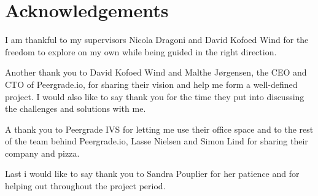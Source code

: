 \chapter{Acknowledgements}

I am thankful to my supervisors Nicola Dragoni and David Kofoed Wind for the freedom to explore on my own while being guided in the right direction.

Another thank you to David Kofoed Wind and Malthe Jørgensen, the CEO and CTO of Peergrade.io, for sharing their vision and help me form a well-defined project. I would also like to say thank you for the time they put into discussing the challenges and solutions with me.

A thank you to Peergrade IVS for letting me use their office space and to the rest of the team behind Peergrade.io, Lasse Nielsen and Simon Lind for sharing their company and pizza.

Last i would like to say thank you to Sandra Pouplier for her patience and for helping out throughout the project period.
